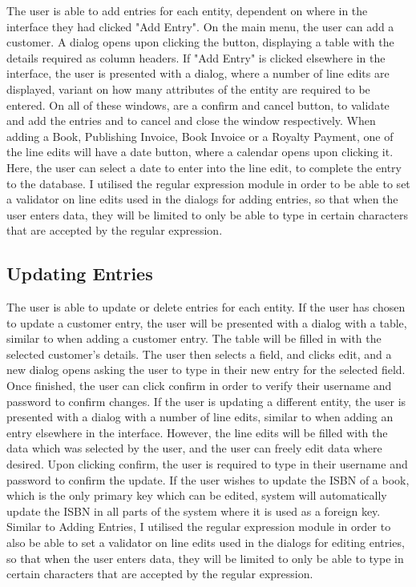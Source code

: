 The user is able to add entries for each entity, dependent on where in the interface they had clicked "Add Entry". On the main menu, the user can add a customer. A dialog opens upon clicking the button, displaying a table with the details required as column headers. If "Add Entry" is clicked elsewhere in the interface, the user is presented with a dialog, where a number of line edits are displayed, variant on how many attributes of the entity are required to be entered. On all of these windows, are a confirm and cancel button, to  validate and add the entries and to cancel and close the window respectively. When adding a Book, Publishing Invoice, Book Invoice or a Royalty Payment, one of the line edits will have a date button, where a calendar opens upon clicking it. Here, the user can select a date to enter into the line edit, to complete the entry to the database. I utilised the regular expression module in order to be able to set a validator on line edits used in the dialogs for adding entries, so that when the user enters data, they will be limited to only be able to type in certain characters that are accepted by the regular expression.

\subsection{Updating Entries}

The user is able to update or delete entries for each entity. If the user has chosen to update a customer entry, the user will be presented with a dialog with a table, similar to when adding a customer entry. The table will be filled in with the selected customer's details. The user then selects a field, and clicks edit, and a new dialog opens asking the user to type in their new entry for the selected field. Once finished, the user can click confirm in order to verify their username and password to confirm changes. If the user is updating a different entity, the user is presented with a dialog with a number of line edits, similar to when adding an entry elsewhere in the interface. However, the line edits will be filled with the data which was selected by the user, and the user can freely edit data where desired. Upon clicking confirm, the user is required to type in their username and password to confirm the update. If the user wishes to update the ISBN of a book, which is the only primary key which can be edited, system will automatically update the ISBN in all parts of the system where it is used as a foreign key. Similar to Adding Entries, I utilised the regular expression module in order to also be able to set a validator on line edits used in the dialogs for editing entries, so that when the user enters data, they will be limited to only be able to type in certain characters that are accepted by the regular expression.

